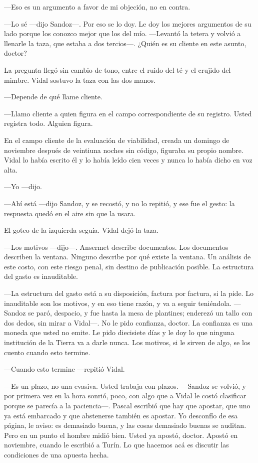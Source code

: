 ---Eso es un argumento a favor de mi objeción, no en contra.

---Lo sé ---dijo Sandoz---. Por eso se lo doy. Le doy los mejores argumentos de su lado porque los conozco mejor que los del mío. ---Levantó la tetera y volvió a llenarle la taza, que estaba a dos tercios---. ¿Quién es su cliente en este asunto, doctor?

La pregunta llegó sin cambio de tono, entre el ruido del té y el crujido del mimbre. Vidal sostuvo la taza con las dos manos.

---Depende de qué llame cliente.

---Llamo cliente a quien figura en el campo correspondiente de su registro. Usted registra todo. Alguien figura.

En el campo cliente de la evaluación de viabilidad, creada un domingo de noviembre después de veintiuna noches sin código, figuraba su propio nombre. Vidal lo había escrito él y lo había leído cien veces y nunca lo había dicho en voz alta.

---Yo ---dijo.

---Ahí está ---dijo Sandoz, y se recostó, y no lo repitió, y ese fue el gesto: la respuesta quedó en el aire sin que la usara.

El goteo de la izquierda seguía. Vidal dejó la taza.

---Los motivos ---dijo---. Ansermet describe documentos. Los documentos describen la ventana. Ninguno describe por qué existe la ventana. Un análisis de este costo, con este riesgo penal, sin destino de publicación posible. La estructura del gasto es inauditable.

---La estructura del gasto está a su disposición, factura por factura, si la pide. Lo inauditable son los motivos, y en eso tiene razón, y va a seguir teniéndola. ---Sandoz se paró, despacio, y fue hasta la mesa de plantines; enderezó un tallo con dos dedos, sin mirar a Vidal---. No le pido confianza, doctor. La confianza es una moneda que usted no emite. Le pido diecisiete días y le doy lo que ninguna institución de la Tierra va a darle nunca. Los motivos, si le sirven de algo, se los cuento cuando esto termine.

---Cuando esto termine ---repitió Vidal.

---Es un plazo, no una evasiva. Usted trabaja con plazos. ---Sandoz se volvió, y por primera vez en la hora sonrió, poco, con algo que a Vidal le costó clasificar porque se parecía a la paciencia---. Pascal escribió que hay que apostar, que uno ya está embarcado y que abstenerse también es apostar. Yo desconfío de esa página, le aviso: es demasiado buena, y las cosas demasiado buenas se auditan. Pero en un punto el hombre midió bien. Usted ya apostó, doctor. Apostó en noviembre, cuando le escribió a Turín. Lo que hacemos acá es discutir las condiciones de una apuesta hecha.

